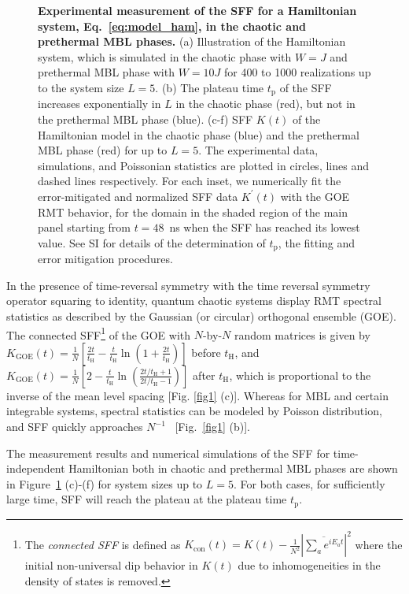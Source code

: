 \documentclass[aps,prx,reprint,twocolumn,superscriptaddress,floatfix,nofootinbib]{revtex4-2}
\newcommand{\thei}{t_{\mathrm{H}}}
\newcommand{\tplateau}{t_{\mathrm{p}}}
\newcommand{\N}{N}
\begin{document}
\begin{figure}[htbp]
\centering
{}
\caption{ {\bf Experimental measurement of the SFF for a Hamiltonian system, Eq.~\eqref{eq:model_ham}, in the chaotic and prethermal MBL phases.}
(a) Illustration of the Hamiltonian system, which is simulated in the chaotic phase with $W=J$ and prethermal MBL phase with $W= 10J$ for 400 to 1000 realizations up to the system size $L= 5$.
(b) The plateau time $\tplateau$ of the SFF increases exponentially in $L$ in the chaotic phase (red), but not in the prethermal MBL phase (blue).
(c-f) SFF $K(t)$ of the Hamiltonian model in the chaotic phase (blue) and the prethermal MBL phase (red) for up to $L=5$.  The experimental data, simulations, and Poissonian statistics are plotted in circles, lines and dashed lines respectively.
For each inset, we numerically fit the error-mitigated and normalized SFF data $K^{\prime}\left(t\right)$ with the GOE RMT behavior, for the domain in the shaded region of the main panel starting from $t= 48$~ns when the SFF has reached its lowest value.
See SI for details of the determination of $\tplateau$, the fitting and error mitigation procedures.}
\label{fig:Ham_Model}
\end{figure}

In the presence of time-reversal symmetry with the time reversal symmetry operator squaring to identity, quantum chaotic systems display RMT spectral statistics as described by the Gaussian (or circular) orthogonal ensemble (GOE). The connected SFF\footnote{The \textit{connected SFF} is defined as $K_\mathrm{con}(t)= K(t) -
\frac{1}{\N^2} \left| \overline{\sum_{a} e^{iE_a t}} \right|^2 $ where the initial non-universal dip behavior in $K(t)$ due to inhomogeneities in the density of states is removed.} of the GOE with $N$-by-$N$ random matrices is given by $K_{\mathrm{GOE}}(t)=\frac{1}{N}\left[ \frac{2t}{\thei} - \frac{t}{\thei} \ln \left(1+ \frac{2t}{\thei}\right) \right]$ before $\thei$, and $K_{\mathrm{GOE}}(t)= \frac{1}{N}\left[ 2 - \frac{t}{\thei} \ln \left(\frac{2 t/\thei+1}{2 t/ \thei-1}\right) \right]$ after $\thei$, which is proportional to the inverse of the mean level spacing [Fig. \ref{fig1} (c)].
Whereas for MBL and certain integrable systems, spectral statistics can be modeled by  Poisson distribution, and SFF quickly approaches $N^{-1}$~\cite{BerryTabor, Prakash2021} [Fig.~\ref{fig1} (b)].

The measurement results and numerical simulations of the SFF for time-independent Hamiltonian both in chaotic and prethermal MBL phases are shown in Figure~\ref{fig:Ham_Model} (c)-(f) for system sizes up to $L=5$. For both cases, for sufficiently large time, SFF will reach the plateau at the plateau time $\tplateau$.
\end{document}
